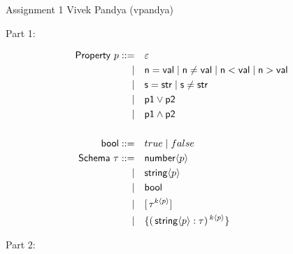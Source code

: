 \documentclass[11pt]{article}
\newcommand{\prop}[1]{\langle{#1}\rangle}%
\begin{document}
\hwtitle
  {Assignment 1}
  {Vivek Pandya (vpandya)} %


Part 1:

\begin{alignat*}{1}
\msf{Property}~p ::= \qamp \varepsilon \\
\mid \qamp \msf{n} = \msf{val} \mid \msf{n} \ne \msf{val} \mid \msf{n} < \msf{val} \mid \msf{n} > \msf{val} \\
\mid \qamp \msf{s} = \msf{str} \mid \msf{s} \ne \msf{str} \\
\mid \qamp \msf{p1} \vee \msf{p2} \\
\mid \qamp \msf{p1} \wedge \msf{p2} \\
\\
\msf{bool} ::= \qamp true \mid false \\
\msf{Schema}~\tau ::= \qamp \tnum \prop{p} \\
\mid \qamp \tstr \prop{p}\\
\mid \qamp \msf{bool} \\
\mid \qamp [\, \tau^{k\prop{p}} ]\, \\
\mid \qamp \{ (\, \tstr \prop{p} : \tau)\, ^{k\prop{p}}\} \\
\end{alignat*}

Part 2:
\end{document}
